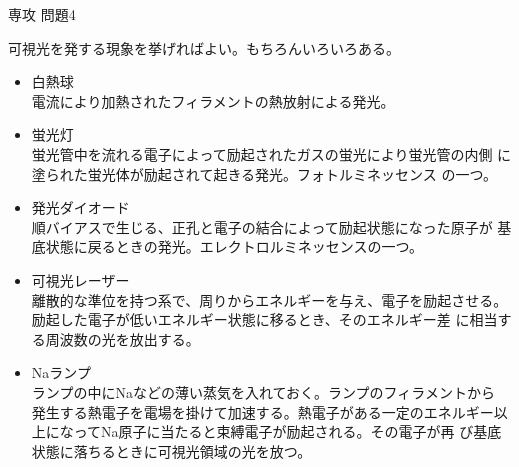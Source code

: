 \documentclass[fleqn]{jbook}
\begin{document}
\begin{answer}{専攻 問題4}{}
\begin{subanswers}
\SubAnswer
可視光を発する現象を挙げればよい。もちろんいろいろある。\\
 \begin{itemize}
 \item 白熱球 \\
      電流により加熱されたフィラメントの熱放射による発光。
 \item 蛍光灯 \\
      蛍光管中を流れる電子によって励起されたガスの蛍光により蛍光管の内側
      に塗られた蛍光体が励起されて起きる発光。フォトルミネッセンス
      の一つ。
 \item 発光ダイオード \\
      順バイアスで生じる、正孔と電子の結合によって励起状態になった原子が
      基底状態に戻るときの発光。エレクトロルミネッセンスの一つ。
 \item 可視光レーザー \\
       離散的な準位を持つ系で、周りからエネルギーを与え、電子を励起させる。
       励起した電子が低いエネルギー状態に移るとき、そのエネルギー差
       に相当する周波数の光を放出する。
  \item Naランプ \\
       ランプの中にNaなどの薄い蒸気を入れておく。ランプのフィラメントから
       発生する熱電子を電場を掛けて加速する。熱電子がある一定のエネルギー以
       上になってNa原子に当たると束縛電子が励起される。その電子が再
       び基底状態に落ちるときに可視光領域の光を放つ。
 \end{itemize}


\end{subanswers}
\end{answer}
\end{document}
